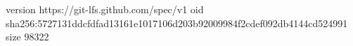 version https://git-lfs.github.com/spec/v1
oid sha256:5727131ddcfdfad13161e1017106d203b92009984f2cdef092db4144cd524991
size 98322
